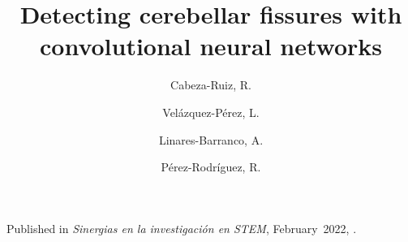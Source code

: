 \author
{
    Cabeza-Ruiz, R.
    \and    
    Velázquez-Pérez, L.
    \and
    Linares-Barranco, A.
    \and 
    Pérez-Rodríguez, R.
}
\title{Detecting cerebellar fissures with convolutional neural networks}
\metadata
{
    Published in \emph{Sinergias en la investigación en STEM},
    February~2022,
    .
}
\maketitle
\label{pap:second}
